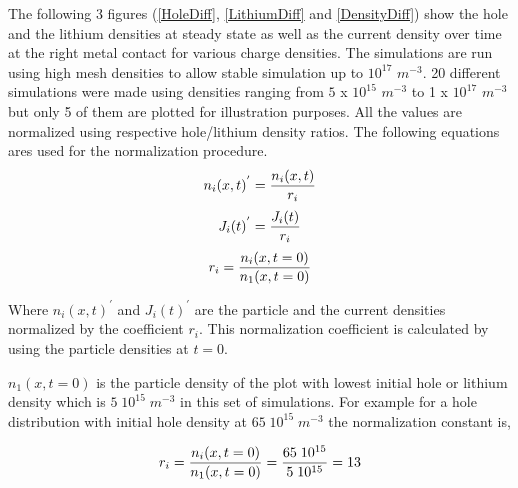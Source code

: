 \begin{doublespace}
 The following 3 figures (\ref{HoleDiff}, \ref{LithiumDiff} and \ref{DensityDiff}) show the hole and the lithium densities at steady state as well as the current density over time at the right metal contact for various charge densities. The simulations are run using high mesh densities to allow stable simulation up to $10^{17}$ $m^{-3}$. 20 different simulations were made using densities ranging from $5$ x $10^{15}$  $m^{-3}$ to 1 x $10^{17}$  $m^{-3}$ but only 5 of them are plotted for illustration purposes. All the values are normalized using respective hole/lithium density ratios. The following equations ares used for the normalization procedure.
\begin{equation}
\centering
n_{i}(x,t)^{'}= \frac{n_{i}(x,t)}{r_i} 
\end{equation}
\begin{equation}
\centering
J_{i}(t)^{'}= \frac{J_i(t)}{r_i} 
\end{equation}
\begin{equation}
\centering
r_i = \frac{n_{i}(x,t=0)}{n_{1}(x,t=0)}
\label{NormConst}
\end{equation}

Where $n_{i}(x,t)^{'}$ and $J_{i}(t)^{'}$ are the particle and the current densities normalized by the coefficient $r_{i}$. This normalization coefficient is calculated by using the particle densities at $t=0$. 

$n_{1}(x,t=0)$ is the particle density of the plot with lowest initial hole or lithium density which is $5\;10^{15}\;m^{-3}$ in this set of simulations. For example for a hole distribution with initial hole density at $65\;10^{15}\;m^{-3}$ the normalization constant is,

\begin{equation}
\centering
r_i = \frac{n_{i}(x,t=0)}{n_{1}(x,t=0)} = \frac{65\;10^{15} }{5\;10^{15}} = 13
\label{NormConstVal}
\end{equation}


\end{doublespace}
